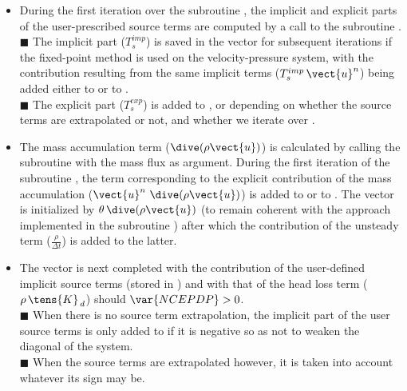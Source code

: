 \begin{itemize}
\item During the first iteration over the subroutine , the implicit and explicit parts of the user-prescribed source terms are computed by a call to the subroutine .\\
{\tiny$\blacksquare$} The implicit part ($T_s^{imp}$) is saved in the vector  for subsequent iterations if the fixed-point method is used on the velocity-pressure system, with the contribution resulting from the same implicit terms ($T_s^{imp}\,\vect{u}^n$) being added either to  or to .\\
{\tiny$\blacksquare$} The explicit part ($T_s^{exp}$) is added to ,  or  depending on whether the source terms are extrapolated or not, and whether we iterate over .\\

\item The mass accumulation term ($\dive(\rho \vect {u})$) is calculated by calling the subroutine  with the mass flux as argument. During the first iteration of the subroutine ,
the term corresponding to the explicit contribution of the mass accumulation ($\vect{u}^{n}\ \dive(\rho \vect{u})$) is added to  or to . The vector  is initialized by $\theta\,\dive(\rho \vect{u})$ (to remain coherent with the approach implemented in the subroutine
) after which the contribution of the unsteady term ($\displaystyle
\frac{\rho}{\Delta t}$) is added to the latter.\\

\item The vector  is next completed with the contribution of the user-defined implicit source terms (stored in ) and with that of the head loss term ($\rho\,\tens{K}_{\,d}$) should $\var{NCEPDP}>0$.\\
{\tiny$\blacksquare$} When there is no source term extrapolation, the implicit part of the user source terms is  only added to  if it is negative so as not to weaken the diagonal of the system.\\
{\tiny$\blacksquare$} When the source terms are extrapolated however, it is taken into account whatever its sign may be.\\


\end{itemize}
